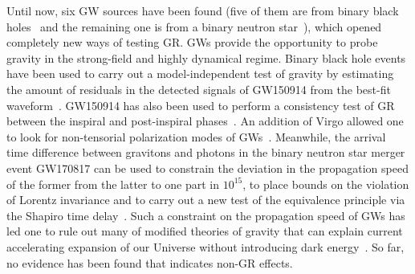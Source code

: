 \documentclass[prd,twocolumn,nofootinbib]{revtex4-1}
\begin{document}
Until now, six GW sources have been found (five of them are from binary black holes~\cite{Abbott:2016blz,Abbott:2016nmj,Abbott:2017vtc,Abbott:2017gyy,Abbott:2017oio} and the remaining one is from a binary neutron star~\cite{TheLIGOScientific:2017qsa}), which opened completely new ways of testing GR. 
GWs provide the opportunity to probe gravity in the strong-field and highly dynamical regime.
Binary black hole events have been used to carry out a model-independent test of gravity by estimating the amount of residuals in the detected signals of GW150914 from the best-fit waveform~\cite{TheLIGOScientific:2016src}. GW150914 has also been used to perform a consistency test of GR between the inspiral and post-inspiral phases~\cite{TheLIGOScientific:2016src}. An addition of Virgo allowed one to look for non-tensorial polarization modes of GWs~\cite{Abbott:2017oio}. Meanwhile, the arrival time difference between gravitons and photons in the binary neutron star merger event GW170817 can be used to constrain the deviation in the propagation speed of the former from the latter to one part in $10^{15}$, to place bounds on the violation of Lorentz invariance and to carry out a new test of the equivalence principle via the Shapiro time delay~\cite{Monitor:2017mdv}.
Such a constraint on the propagation speed of GWs has led one to rule out many of modified theories of gravity that can explain current accelerating expansion of our Universe without introducing dark energy~\cite{Baker:2017hug,Creminelli:2017sry,Ezquiaga:2017ekz,Battye:2018ssx,Ezquiaga:2018btd}.
So far, no evidence has been found that indicates non-GR effects.
\end{document}
